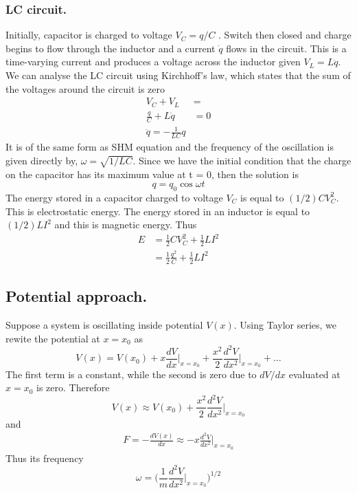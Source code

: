 \documentclass[../main.tex]{subfiles}
\begin{document}
\subsubsection*{LC circuit.} Initially, capacitor is charged to voltage $V_C=q/C$ . Switch then closed and  charge begins to flow through the inductor and a current $\dot{q}$ flows in the circuit. This is a time-varying current and produces a voltage across the inductor given $V_L=L\ddot{q}$. We can analyse the LC circuit using Kirchhoff's law, which states that the sum of the voltages around the circuit is zero
\begin{align*}
    V_C+V_L&=\\
    \frac{q}{C}+L\ddot{q}&=0\\
    \ddot{q}=-\frac{1}{LC}q
\end{align*}
It is of the same form as SHM equation and the frequency of the oscillation is given directly by, $\omega = \sqrt{1/LC}$. Since we have the initial condition that the charge on the capacitor has its maximum value at t = 0, then the solution is
\begin{equation*}
    q=q_0\cos\omega t
\end{equation*}
The energy stored in a capacitor charged to voltage $V_C$ is equal to $(1/2) CV_C^2$. This is electrostatic energy. The energy stored in an inductor is equal to $(1/2) LI^2$ and this is magnetic energy. Thus \begin{align*}
    E&=\frac{1}{2}CV_C^2+\frac{1}{2}LI^2\\
    &=\frac{1}{2}\frac{q^2}{C}+\frac{1}{2}LI^2
\end{align*}

\subsection*{Potential approach.} Suppose a system is oscillating inside potential $V(x)$. Using Taylor series, we rewite the potential at $x=x_0$ as
\begin{equation*}
    V(x)=V(x_0)+x\frac{dV}{dx}\bigg|_{x=x_0}+\frac{x^2}{2}\frac{d^2V}{dx^2}\bigg|_{x=x_0}+\dots
\end{equation*}
The first term is a constant, while the second is zero due to $dV/dx$ evaluated at $x=x_0$ is zero. Therefore 
\begin{equation*}
    V(x)\approx V(x_0)+\frac{x^2}{2}\frac{d^2V}{dx^2}\bigg|_{x=x_0}
\end{equation*}
and 
\begin{align*}
    F=-\frac{dV(x)}{dx}\approx-x\frac{d^2V}{dx^2}\bigg|_{x=x_0}
\end{align*}
Thus its frequency
\begin{equation*}
    \omega=\biggl(\frac{1}{m}\frac{d^2V}{dx^2}\bigg|_{x=x_0}\biggr)^{1/2}
\end{equation*} 
\end{document}
